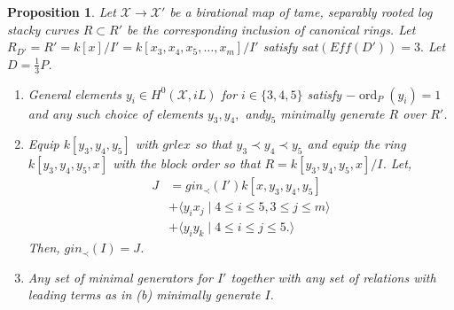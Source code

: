 \documentclass{amsart}
\theoremstyle{plain}
\newtheorem{prop}[thm]{Proposition}
\theoremstyle{definition}
\theoremstyle{remark}
\numberwithin{equation}{section}
\newcommand \sx{\mathscr X}
\DeclareMathOperator{\ord}{ord}
\begin{document}
\begin{prop}
\label{prop:sat_three_induction}
Let $\sx \rightarrow \sx'$ be a birational map of tame, separably rooted  log stacky curves $R \subset R'$ be the corresponding inclusion of canonical rings. Let $R_{D'} = R' = k[x]/I'= k[x_3,x_4,x_5,\ldots, x_m]/I'$ satisfy $sat(Eff(D')) = 3.$ Let $D = \frac{1}{3}P$. 
\begin{enumerate}
	\item[(a)] General elements  $y_i \in H^0(\sx,iL)$ for $i \in \{3,4,5\}$ satisfy $-\ord_P(y_i) = 1$ and any such choice of elements $y_3,y_4,$ and$ y_5$ minimally generate $R$ over $R'$.
	\item[(b)] Equip $k[y_3,y_4,y_5]$ with $grlex$ so that $y_3 \prec y_4 \prec y_5$ and equip the ring $k[y_3,y_4,y_5,x]$ with the block order so that $R = k[y_3,y_4,y_5,x]/I$. Let,
	\begin{align*}
	J &= gin_\prec(I')k[x,y_3,y_4,y_5] \\
	&+\langle y_i x_j \mid 4 \leq i \leq 5, 3 \leq j \leq m\rangle \\
	&+\langle y_iy_k \mid 4 \leq i \leq j \leq 5.\rangle 
\end{align*}
Then, $gin_\prec(I) = J$.
	\item[(c)] Any set of minimal generators for $I'$ together with any set of relations with leading terms as in (b) minimally generate $I$.
\end{enumerate}
\end{prop}
\end{document}
